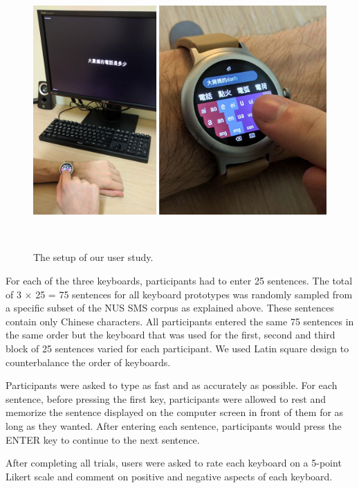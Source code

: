 \begin{figure}
  \centering
  \includegraphics[width=1\columnwidth]{figures/user_study_setup}
  \caption{The setup of our user study.}~\label{fig:figure4}
\end{figure}








For each of the three keyboards, participants had to enter 25 sentences. The total of 3 $\times$ 25 = 75 sentences for all keyboard prototypes was randomly sampled from a specific subset of the NUS SMS corpus \cite{Chen2013} as explained above. These sentences contain only Chinese characters. All participants entered the same 75 sentences in the same order but the keyboard that was used for the first, second and third block of 25 sentences varied for each participant. We used Latin square design to counterbalance the order of keyboards.

Participants were asked to type as fast and as accurately as possible. For each sentence, before pressing the first key, participants were allowed to rest and memorize the sentence displayed on the computer screen in front of them for as long as they wanted. After entering each sentence, participants would press the ENTER key to continue to the next sentence.

After completing all trials, users were asked to rate each keyboard on a 5-point Likert scale and comment on positive and negative aspects of each keyboard.








